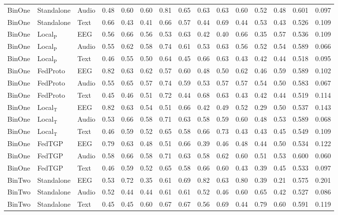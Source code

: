 \begin{longtable}{lllcccccccccccc}
BinOne & Standalone & Audio & 0.48 & 0.60 & 0.60 & 0.81 & 0.65 & 0.63 & 0.63 & 0.60 & 0.52 & 0.48 & 0.601 & 0.097 \\
BinOne & Standalone & Text & 0.66 & 0.43 & 0.41 & 0.66 & 0.57 & 0.44 & 0.69 & 0.44 & 0.53 & 0.43 & 0.526 & 0.109 \\
BinOne & Local$_{\mathrm{P}}$ & EEG & 0.56 & 0.66 & 0.56 & 0.53 & 0.63 & 0.42 & 0.40 & 0.66 & 0.35 & 0.57 & 0.536 & 0.109 \\
BinOne & Local$_{\mathrm{P}}$ & Audio & 0.55 & 0.62 & 0.58 & 0.74 & 0.61 & 0.53 & 0.63 & 0.56 & 0.52 & 0.54 & 0.589 & 0.066 \\
BinOne & Local$_{\mathrm{P}}$ & Text & 0.46 & 0.55 & 0.50 & 0.64 & 0.45 & 0.66 & 0.63 & 0.43 & 0.42 & 0.44 & 0.518 & 0.095 \\
BinOne & FedProto & EEG & 0.82 & 0.63 & 0.62 & 0.57 & 0.60 & 0.48 & 0.50 & 0.62 & 0.46 & 0.59 & 0.589 & 0.102 \\
BinOne & FedProto & Audio & 0.55 & 0.65 & 0.57 & 0.74 & 0.59 & 0.53 & 0.57 & 0.57 & 0.54 & 0.50 & 0.583 & 0.067 \\
BinOne & FedProto & Text & 0.45 & 0.46 & 0.51 & 0.72 & 0.44 & 0.68 & 0.63 & 0.43 & 0.42 & 0.44 & 0.519 & 0.114 \\
BinOne & Local$_{\mathrm{T}}$ & EEG & 0.82 & 0.63 & 0.54 & 0.51 & 0.66 & 0.42 & 0.49 & 0.52 & 0.29 & 0.50 & 0.537 & 0.143 \\
BinOne & Local$_{\mathrm{T}}$ & Audio & 0.53 & 0.66 & 0.58 & 0.71 & 0.63 & 0.58 & 0.59 & 0.60 & 0.48 & 0.53 & 0.589 & 0.068 \\
BinOne & Local$_{\mathrm{T}}$ & Text & 0.46 & 0.59 & 0.52 & 0.65 & 0.58 & 0.66 & 0.73 & 0.43 & 0.43 & 0.45 & 0.549 & 0.109 \\
BinOne & FedTGP & EEG & 0.79 & 0.63 & 0.48 & 0.51 & 0.66 & 0.39 & 0.46 & 0.48 & 0.44 & 0.50 & 0.534 & 0.122 \\
BinOne & FedTGP & Audio & 0.58 & 0.66 & 0.58 & 0.71 & 0.63 & 0.58 & 0.62 & 0.60 & 0.51 & 0.53 & 0.600 & 0.060 \\
BinOne & FedTGP & Text & 0.46 & 0.59 & 0.52 & 0.65 & 0.58 & 0.66 & 0.60 & 0.43 & 0.39 & 0.45 & 0.533 & 0.097 \\
\midrule
BinTwo & Standalone & EEG & 0.53 & 0.72 & 0.35 & 0.61 & 0.69 & 0.82 & 0.63 & 0.80 & 0.39 & 0.21 & 0.575 & 0.201 \\
BinTwo & Standalone & Audio & 0.52 & 0.44 & 0.44 & 0.61 & 0.61 & 0.52 & 0.46 & 0.60 & 0.65 & 0.42 & 0.527 & 0.086 \\
BinTwo & Standalone & Text & 0.45 & 0.45 & 0.60 & 0.67 & 0.67 & 0.56 & 0.69 & 0.44 & 0.79 & 0.60 & 0.591 & 0.119 \\

\end{longtable}
